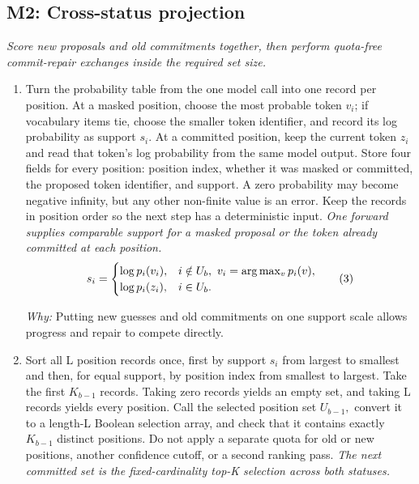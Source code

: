 \documentclass[10pt,a4paper]{article}
\begin{document}
\subsection*{M2: Cross-status projection}
\emph{Score new proposals and old commitments together, then perform quota-free commit-repair exchanges inside the required set size.}
\begin{enumerate}[leftmargin=*,start=6]
  \item Turn the probability table from the one model call into one record per position. At a masked position, choose the most probable token \(v_{i}\);\allowbreak{} if vocabulary items tie, choose the smaller token identifier, and record its log probability as support \(s_{i}.\) At a committed position, keep the current token \(z_{i}\) and read that token's log probability from the same model output. Store four fields for every position: position index, whether it was masked or committed, the proposed token identifier, and support. A zero probability may become negative infinity, but any other non-finite value is an error. Keep the records in position order so the next step has a deterministic input.
\noindent\emph{One forward supplies comparable support for a masked proposal or the token already committed at each position.}
\begin{equation}
\resizebox{\ifdim\width>\linewidth \linewidth\else\width\fi}{!}{$\displaystyle s_i=\begin{cases}\log p_i(v_i), & i\notin U_b,\ v_i=\arg\max_v p_i(v),\\ \log p_i(z_i), & i\in U_b.\end{cases}$} \tag{3}
\end{equation}
\par\emph{Why:} Putting new guesses and old commitments on one support scale allows progress and repair to compete directly.
  \item Sort all L position records once, first by support \(s_{i}\) from largest to smallest and then, for equal support, by position index from smallest to largest. Take the first \(K_{b-1}\) records. Taking zero records yields an empty set, and taking L records yields every position. Call the selected position set \(U_{b-1},\) convert it to a length-L Boolean selection array, and check that it contains exactly \(K_{b-1}\) distinct positions. Do not apply a separate quota for old or new positions, another confidence cutoff, or a second ranking pass.
\noindent\emph{The next committed set is the fixed-cardinality top-K selection across both statuses.}
\begin{equation}

\end{equation}
\end{enumerate}
\end{document}
